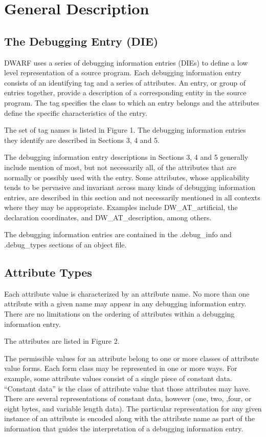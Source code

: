 \chapter{General Description}
\label{chap:generaldescription}
\section{The Debugging Entry (DIE)}
\label{chap:thedebuggingentrydie}
DWARF uses a series of debugging information entries (DIEs) to 
define a low\dash{} level
representation of a source program. 
Each debugging information entry consists of an identifying
tag and a series of attributes. 
An entry, or group of entries together, provide a description of a
corresponding entity in the source program. 
The tag specifies the class to which an entry belongs
and the attributes define the specific characteristics of the entry.

The set of tag names is listed in Figure 1. 
The debugging information entries they identify are
described in Sections 3, 4 and 5.

The debugging information entry descriptions 
in Sections 3, 4 and 5 generally include mention of
most, but not necessarily all, of the attributes 
that are normally or possibly used with the entry.
Some attributes, whose applicability tends to be 
pervasive and invariant across many kinds of
debugging information entries, are described in 
this section and not necessarily mentioned in all
contexts where they may be appropriate. 
Examples include DW\-\_AT\-\_artificial, the declaration
coordinates, and DW\-\_AT\-\_description, among others.

The debugging information entries are contained 
in the .debug\_info and .debug\_types
sections of an object file.



\section{Attribute Types}
\label{chap:attributetypes}
Each attribute value is characterized by an attribute name. 
No more than one attribute with a given name may appear in any
debugging information entry. 
There are no limitations on the
ordering of attributes within a debugging information entry.

The attributes are listed in Figure 2.  

The permissible values
for an attribute belong to one or more classes of attribute
value forms.  
Each form class may be represented in one or more ways. 
For example, some attribute values consist
of a single piece of constant data. 
``Constant data''
is the class of attribute value that those attributes may have. 
There are several representations of constant data,
however (one, two, ,four, or eight bytes, and variable length
data). 
The particular representation for any given instance
of an attribute is encoded along with the attribute name as
part of the information that guides the interpretation of a
debugging information entry.  

